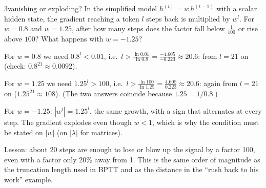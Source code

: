 \begin{nbexercise}{3}{vanishing or exploding?}
\notinslides
In the simplified model $h^{(t)} = w\,h^{(t-1)}$ with a scalar hidden state, the
gradient reaching a token $l$ steps back is multiplied by $w^l$. For $w = 0.8$ and
$w = 1.25$, after how many steps does the factor fall below $\frac{1}{100}$ or rise
above $100$? What happens with $w = -1.25$?
\end{nbexercise}
\begin{nbsolution}
For $w = 0.8$ we need $0.8^l < 0.01$, i.e.\ $l > \frac{\ln 0.01}{\ln 0.8} =
\frac{-4.605}{-0.223} \approx 20.6$: from $l = 21$ on (check: $0.8^{21} \approx 0.0092$).

For $w = 1.25$ we need $1.25^l > 100$, i.e.\ $l > \frac{\ln 100}{\ln 1.25} =
\frac{4.605}{0.223} \approx 20.6$: again from $l = 21$ on ($1.25^{21} \approx 108$).
(The two answers coincide because $1.25 = 1/0.8$.)

For $w = -1.25$: $|w^l| = 1.25^l$, the same growth, with a sign that alternates at
every step. The gradient explodes even though $w < 1$, which is why the condition must
be stated on $|w|$ (on $|\lambda|$ for matrices).

Lesson: about 20 steps are enough to lose or blow up the signal by a factor 100, even
with a factor only 20\% away from 1. This is the same order of magnitude as the
truncation length used in BPTT and as the distance in the ``rush back to his work''
example.
\end{nbsolution}
